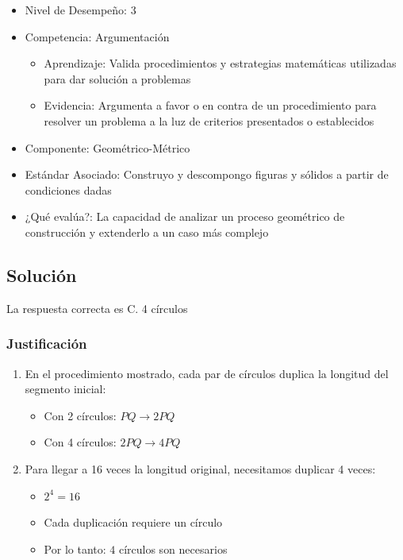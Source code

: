 \documentclass[
]{article}
\providecommand{\tightlist}{%
  \setlength{\itemsep}{0pt}\setlength{\parskip}{0pt}}
\begin{document}
\begin{itemize}
\tightlist
\item
  Nivel de Desempeño: 3
\item
  Competencia: Argumentación

  \begin{itemize}
  \tightlist
  \item
    Aprendizaje: Valida procedimientos y estrategias matemáticas
    utilizadas para dar solución a problemas
  \item
    Evidencia: Argumenta a favor o en contra de un procedimiento para
    resolver un problema a la luz de criterios presentados o
    establecidos
  \end{itemize}
\item
  Componente: Geométrico-Métrico
\item
  Estándar Asociado: Construyo y descompongo figuras y sólidos a partir
  de condiciones dadas
\item
  ¿Qué evalúa?: La capacidad de analizar un proceso geométrico de
  construcción y extenderlo a un caso más complejo
\end{itemize}

\subsection{Solución}\label{soluciuxf3n}

La respuesta correcta es C. 4 círculos

\subsubsection{Justificación}\label{justificaciuxf3n}

\begin{enumerate}
\def\labelenumi{\arabic{enumi}.}
\tightlist
\item
  En el procedimiento mostrado, cada par de círculos duplica la longitud
  del segmento inicial:

  \begin{itemize}
  \tightlist
  \item
    Con 2 círculos: \(PQ \rightarrow 2PQ\)
  \item
    Con 4 círculos: \(2PQ \rightarrow 4PQ\)
  \end{itemize}
\item
  Para llegar a 16 veces la longitud original, necesitamos duplicar 4
  veces:

  \begin{itemize}
  \tightlist
  \item
    \(2^4 = 16\)
  \item
    Cada duplicación requiere un círculo
  \item
    Por lo tanto: \(4\) círculos son necesarios
  \end{itemize}
\end{enumerate}
\end{document}
